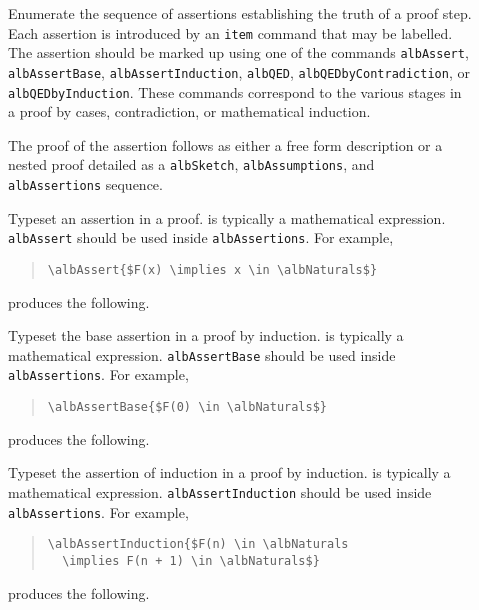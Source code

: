 \documentclass[11pt,a4paper,oneside,titlepage]{alb-corp}
\begin{document}
\begin{description}
\item[] Enumerate the sequence of assertions
  establishing the truth of a proof step.  Each assertion is introduced
  by an \texttt{item} command that may be labelled.  The assertion
  should be marked up using one of the commands \texttt{albAssert},
  \texttt{albAssertBase}, \texttt{albAssertInduction}, \texttt{albQED},
  \texttt{albQEDbyContradiction}, or \texttt{albQEDbyInduction}.  These
  commands correspond to the various stages in a proof by cases,
  contradiction, or mathematical induction.

  The proof of the assertion follows as either a free form description
  or a nested proof detailed as a \texttt{albSketch},
  \texttt{albAssumptions}, and \texttt{albAssertions} sequence.

\item[] Typeset an assertion
  in a proof.   is typically a mathematical
  expression.  \texttt{albAssert} should be used inside
  \texttt{albAssertions}.  For example,
  \begin{quote}
\begin{verbatim}
\albAssert{$F(x) \implies x \in \albNaturals$}
\end{verbatim}
  \end{quote}
  produces the following.
  \begin{quote}
  \end{quote}

\item[] Typeset the base
  assertion in a proof by induction.   is typically
  a mathematical expression.  \texttt{albAssertBase} should be used
  inside \texttt{albAssertions}.  For example,
  \begin{quote}
\begin{verbatim}
\albAssertBase{$F(0) \in \albNaturals$}
\end{verbatim}
  \end{quote}
  produces the following.
  \begin{quote}
  \end{quote}

\item[] Typeset the
  assertion of induction in a proof by induction.  
  is typically a mathematical expression.  \texttt{albAssertInduction}
  should be used inside \texttt{albAssertions}.  For example,
  \begin{quote}
\begin{verbatim}
\albAssertInduction{$F(n) \in \albNaturals
  \implies F(n + 1) \in \albNaturals$}
\end{verbatim}
  \end{quote}
  produces the following.
  \begin{quote}
  \end{quote}


\end{description}
\end{document}
